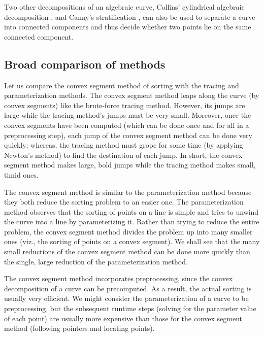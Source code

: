 Two other decompositions of an algebraic curve, Collins' cylindrical algebraic 
decomposition \cite{Co75}, \cite{arnon83} and Canny's stratification \cite{Ca}, 
can also be used to separate a curve into connected components and thus decide whether
two points lie on the same connected component.

\subsection{Broad comparison of methods}

Let us compare the convex segment method of sorting with the tracing and 
parameterization methods.
The convex segment method leaps along the curve (by convex segments)
like the brute-force tracing method.
However, its jumps are large while the tracing method's jumps must be very small.
Moreover, once the convex segments have
been computed (which can be done once and for all in a preprocessing step),
each jump of the convex segment method can be done very quickly; whereas, the tracing
method must grope for some time (by applying Newton's method) to find the destination 
of each jump.
In short, the convex segment method 
makes large, bold jumps while the tracing method makes small, timid ones.

The convex segment method is similar to the parameterization method because
they both reduce the sorting problem to an easier one.
The parameterization method observes that the sorting of points 
on a line is simple and tries to unwind the curve into a line by parameterizing it.
Rather than trying to reduce the entire problem, the convex segment method divides 
the problem up into many smaller ones (viz., the sorting of points on a convex 
segment).
We shall see that the many small reductions of the convex segment method
can be done more quickly than the single, large reduction of
the parameterization method.

The convex segment method incorporates preprocessing, since the convex decomposition
of a curve can be precomputed.
As a result, the actual sorting is usually very efficient.
We might consider the parameterization of a curve to be preprocessing, but
the subsequent runtime steps (solving for the parameter value of each point)
are usually more expensive than those for the convex segment method (following pointers
and locating points).

